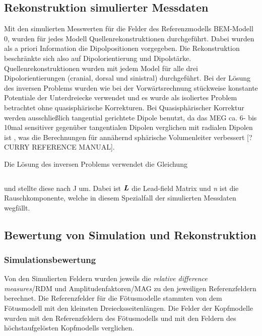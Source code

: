 \subsection{Rekonstruktion simulierter Messdaten}
Mit den simulierten Messwerten für die Felder des Referenzmodells
BEM-Modell 0, wurden für jedes Modell Quellenrekonstruktionen
durchgeführt. Dabei wurden als a priori Information die Dipolpositionen
vorgegeben. Die Rekonstruktion beschränkte sich also auf
Dipolorientierung und Dipolstärke. Quellenrekonstruktionen wurden mit
jedem Model für alle drei Dipolorientierungen (cranial, dorsal und
sinistral) durchgeführt. Bei der Lösung des inversen Problems wurden
wie bei der Vorwärtsrechnung stückweise konstante Potentiale der
Unterdreiecke verwendet und es wurde als isoliertes Problem betrachtet
ohne quasisphärische Korrekturen. Bei Quasisphärischer Korrektur werden
ausschließlich tangential gerichtete Dipole benutzt, da das MEG ca. 6-
bis 10mal sensitiver gegenüber tangentialen Dipolen verglichen mit
radialen Dipolen ist \cite{a2}, was die Berechnungen für annähernd
sphärische Volumenleiter verbessert [?CURRY REFERENCE MANUAL].

Die Lösung des inversen Problems verwendet die Gleichung

\begin{center}
\begin{supertabular}{m{14.909cm}m{1.689cm}}

\end{supertabular}
\end{center}
und stellte diese nach J um. Dabei ist $\boldsubformula{L}$ die
Lead-field Matrix und \textit{n} ist die Rauschkomponente, welche in
diesem Spezialfall der simulierten Messdaten wegfällt.

\subsection{Bewertung von Simulation und Rekonstruktion}
\subsubsection{Simulationsbewertung}
Von den Simulierten Feldern wurden jeweils die \textit{relative
difference measures}/RDM und Amplitudenfaktoren/MAG zu den jeweiligen
Referenzfeldern berechnet. Die Referenzfelder für die Fötusmodelle
stammten von dem Fötusmodell mit den kleinsten Dreiecksseitenlängen.
Die Felder der Kopfmodelle wurden mit den Referenzfeldern des
Fötusmodells und mit den Feldern des höchstaufgelösten Kopfmodells
verglichen.

